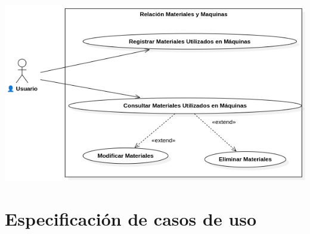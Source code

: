 \documentclass{article}
\begin{document}
\begin{center}
		\includegraphics[width=1\linewidth]{imagenes/cu_relacion_materiales_maquinas.png}
	\end{center}

\section{Especificación de casos de uso}
\end{document}
